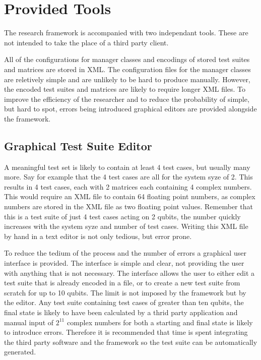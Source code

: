 \section{Provided Tools}
The research framework is accompanied with two independant tools.
These are not intended to take the place of a third party client.

All of the configurations for manager classes and encodings of stored test suites and matrices are stored in XML.
The configuration files for the manager classes are reletively simple and are unlikely to be hard to produce manually.
However, the encoded test suites and matrices are likely to require longer XML files.
To improve the efficiency of the researcher and to reduce the probability of simple, but hard to spot, errors being introduced graphical editors are provided alongside the framework.

\subsection{Graphical Test Suite Editor}
\label{sec:indtestsuiteeditor}
A meaningful test set is likely to contain at least 4 test cases, but usually many more.
Say for example that the 4 test cases are all for the system syze of 2.
This results in 4 test cases, each with 2 matrices each containing 4 complex numbers.
This would require an XML file to contain 64 floating point numbers, as complex numbers are stored in the XML file as two floating point values.
Remember that this is a test suite of just 4 test cases acting on 2 qubits, the number quickly increases with the system syze and number of test cases.
Writing this XML file by hand in a text editor is not only tedious, but error prone.

To reduce the tedium of the process and the number of errors a graphical user interface is provided.
The interface is simple and clear, not providing the user with anything that is not necessary.
The interface allows the user to either edit a test suite that is already encoded in a file, or to create a new test suite from scratch for up to 10 qubits.
The limit is not imposed by the framework but by the editor.
Any test suite containing test cases of greater than ten qubits, the final state is likely to have been calculated by a thrid party application and manual input of $2^{11}$ complex numbers for both a starting and final state is likely to introduce errors.
Therefore it is recommended that time is spent integrating the third party software and the framework so the test suite can be automatically generated.

